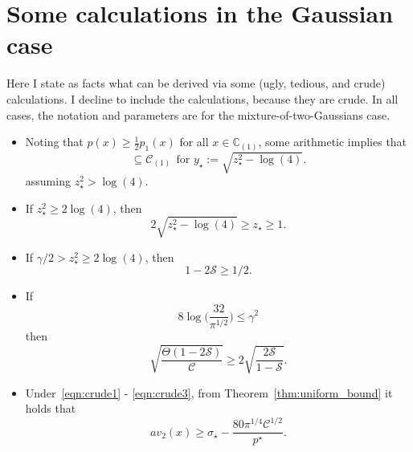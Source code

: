 \documentclass{article}
\newcommand{\1}{\mathbf{1}}
\newcommand{\mc}[1]{\mathcal{#1}}
\newcommand{\mb}[1]{\mathbb{#1}}
\theoremstyle{alden}
\theoremstyle{aldenthm}
\theoremstyle{definition}
\theoremstyle{remark}
\begin{document}
\section{Some calculations in the Gaussian case}
\label{sec:some_calculations}
Here I state as facts what can be derived via some (ugly, tedious, and crude) calculations. I decline to include the calculations, because they are crude. In all cases, the notation and parameters are for the mixture-of-two-Gaussians case.
\begin{itemize}
	\item Noting that $p(x) \geq \frac{1}{2}p_1(x)$ for all $x \in \mb{C}_{(1)}$, some arithmetic implies that
	\begin{equation*}
	[-y_{\star},y_{\star}] \subseteq \mc{C}_{(1)}~~\textrm{for $y_{\star} := \sqrt{z_{\star}^2 - \log(4)}$.}
	\end{equation*}
	assuming $z_{\star}^2 > \log(4)$. 
	\item If $z_{\star}^2 \geq 2\log(4)$, then
	\begin{equation}
	\label{eqn:crude1}
	2\sqrt{z_{\star}^2 - \log(4)} \geq z_{\star} \geq 1.
	\end{equation}
	\item If $\gamma/2 > z_{\star}^2 \geq 2\log(4)$, then 
	\begin{equation}
	\label{eqn:crude2}
	1 - 2\mc{S} \geq 1/2.
	\end{equation}
	\item If
	\begin{equation*}
	8\log\biggl(\frac{32}{\pi^{1/2}}\biggr) \leq \gamma^2
	\end{equation*}
	then 
	\begin{equation}
	\label{eqn:crude3}
	\sqrt{\frac{\Theta(1 - 2\mc{S})}{\mc{C}}} \geq 2\sqrt{\frac{2\mc{S}}{1 - \mc{S}}}.
	\end{equation}
	\item Under~\eqref{eqn:crude1} - \eqref{eqn:crude3}, from Theorem~\ref{thm:uniform_bound} it holds that
	\begin{equation*}
	av_2(x) \geq \sigma_{\star} - \frac{80 \pi^{1/4} \mc{C}^{1/2}}{p^{\star}}.
	\end{equation*}
\end{itemize}
	
\end{document}
